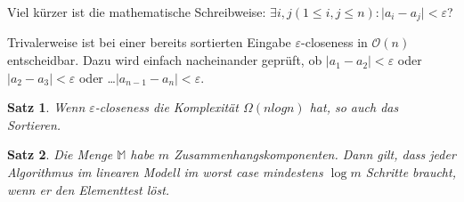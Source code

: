 \documentclass[ngerman,draft,parskip=half*,twoside]{scrreprt}
\theoremstyle{break}
\newtheorem{satz}{Satz}[chapter]
\theoremstyle{nonumberbreak}
\newcommand*{\OO}{\mathcal{O}}      %
\newcommand*{\M}{\mathbb{M}}
\begin{document}
Viel kürzer ist die mathematische Schreibweise: $ \exists   i,  j (1 \leq i, j \leq n):\vert a_i - a_j \vert < \varepsilon $?

Trivalerweise ist bei einer bereits sortierten Eingabe $\varepsilon$-closeness in $\OO(n)$ entscheidbar. Dazu wird einfach nacheinander
geprüft, ob $ \vert a_1 - a_2 \vert < \varepsilon $ oder $ \vert a_2 - a_3 \vert < \varepsilon $ oder \dots $ \vert a_{n-1} -
a_n \vert < \varepsilon $.

\begin{satz} 
Wenn $\varepsilon$-closeness die Komplexität $\Omega (n  log  n)$ hat, so auch das Sortieren.
\end{satz}		
		
\begin{satz}
Die Menge  $ \M  $ habe $m$ Zusammenhangskomponenten. Dann gilt, dass jeder Algorithmus im linearen Modell im worst case
mindestens $ \log m $ Schritte braucht, wenn er den Elementtest löst.
\end{satz}
		 	
\end{document}
